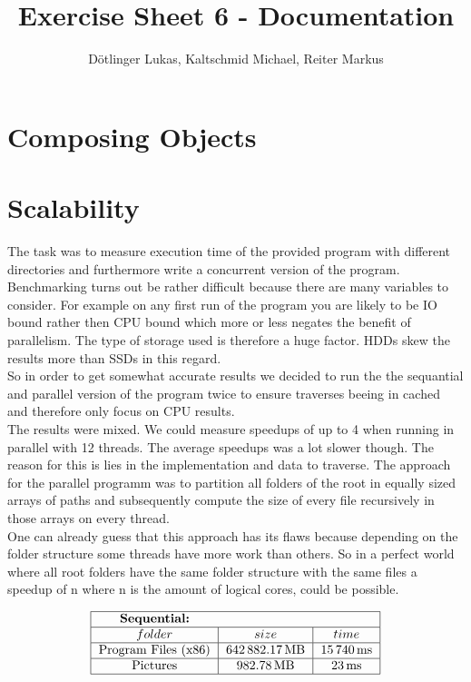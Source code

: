 \documentclass{article}
\title{Exercise Sheet 6 - Documentation}
\date{}
\author{Dötlinger Lukas, Kaltschmid Michael, Reiter Markus}
\begin{document}
  \RaggedRight

  \maketitle

  \section{Composing Objects}

  \section{Scalability}
    The task was to measure execution time of the provided program with different directories and furthermore write a concurrent version of the program.
    \\[3pt]
    Benchmarking turns out be rather difficult because there are many variables to consider. For example on any first run of the program you are likely to be IO bound rather then CPU bound which more or less negates the benefit of parallelism. The type of storage used is therefore a huge factor. HDDs skew the results more than SSDs in this regard.
    \\[3pt]
    So in order to get somewhat accurate results we decided to run the the sequantial and parallel version of the program twice to ensure traverses beeing in cached and therefore only focus on CPU results.
    \\[3pt]
    The results were mixed. We could measure speedups of up to 4 when running in parallel with 12 threads. The average speedups was a lot slower though. The reason for this is lies in the implementation and data to traverse. The approach for the parallel programm was to partition all folders of the root in equally sized arrays of paths and subsequently compute the size of every file recursively in those arrays on every thread.
    \\[3pt]
    One can already guess that this approach has its flaws because depending on the folder structure some threads have more work than others. So in a perfect world where all root folders have the same folder structure with the same files a speedup of n where n is the amount of logical cores, could be possible.
    \\[24pt]
    \begin{doublespacing}
      \begin{align*}
        \begin{tabular}{|*{3}{c|}}
          \hline
          \multicolumn{1}{|c}{\bfseries Sequential:} & \multicolumn{1}{c}{} & \multicolumn{1}{c|}{} \\
          \hline
          $folder$ & $size$ & $time$ \\
          \hline
          Program Files (x86) & $\SI{642882.17}{\mega\byte}$ & $\SI{15740}{\milli\second}$ \\
          \hline
          Pictures & $\SI{982.78}{\mega\byte}$ & $\SI{23}{\milli\second}$ \\
          \hline
        \end{tabular}
      \end{align*}
    \end{doublespacing}
\end{document}
